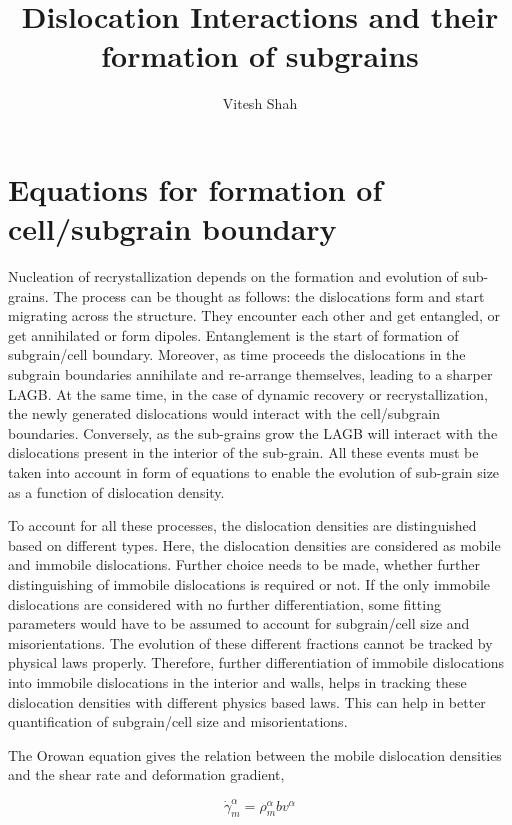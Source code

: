 \documentclass[a4paper,11pt]{article}
\author{Vitesh Shah}
\title{Dislocation Interactions and their formation of subgrains}
\begin{document}
\maketitle
\section{Equations for formation of cell/subgrain boundary} \fussy

\par Nucleation of recrystallization depends on the formation and evolution of sub-grains. The process can be thought as follows: the dislocations form and start migrating across the structure. They encounter each other and get entangled, or get annihilated or form dipoles. Entanglement is the start of formation of subgrain/cell boundary. Moreover, as time proceeds the dislocations in the subgrain boundaries annihilate and re-arrange themselves, leading to a sharper LAGB. At the same time, in the case of dynamic recovery or recrystallization, the newly generated dislocations would interact with the cell/subgrain boundaries. Conversely, as the sub-grains grow the LAGB will interact with the dislocations present in the interior of the sub-grain. All these events must be taken into account in form of equations to enable the evolution of sub-grain size as a function of dislocation density. \par

To account for all these processes, the dislocation densities are distinguished based on different types. 
Here, the dislocation densities are considered as mobile and immobile dislocations. 
Further choice needs to be made, whether further distinguishing of immobile dislocations is required or not. 
If the only immobile dislocations are considered with no further differentiation, some fitting parameters would have to be assumed to account for subgrain/cell size and misorientations. 
The evolution of these different fractions cannot be tracked by physical laws properly. 
Therefore, further differentiation of immobile dislocations into immobile dislocations in the interior and walls, helps in tracking these dislocation densities with different physics based laws. 
This can help in better quantification of subgrain/cell size and misorientations. 

The Orowan equation gives the relation between the mobile dislocation densities and the shear rate and deformation gradient,

\begin{equation} 
\dot{\gamma}_m^\alpha = \rho_m^\alpha b v^\alpha \label{eq:1}
\end{equation}
\end{document}
